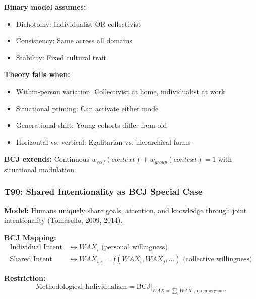 \begin{tcolorbox}[colback=red!5!white, colframe=red!75!black,
    title=Boundary Condition: Where Binary I/C Fails]
\textbf{Binary model assumes:}
\begin{itemize}[nosep]
\item Dichotomy: Individualist OR collectivist
\item Consistency: Same across all domains
\item Stability: Fixed cultural trait
\end{itemize}

\textbf{Theory fails when:}
\begin{itemize}[nosep]
\item Within-person variation: Collectivist at home, individualist at work
\item Situational priming: Can activate either mode
\item Generational shift: Young cohorts differ from old
\item Horizontal vs. vertical: Egalitarian vs. hierarchical forms
\end{itemize}

\textbf{BCJ extends:} Continuous $w_{self}(context) + w_{group}(context) = 1$ with situational modulation.
\end{tcolorbox}

\subsubsection*{T90: Shared Intentionality as BCJ Special Case}

\textbf{Model:} Humans uniquely share goals, attention, and knowledge through joint intentionality (Tomasello, 2009, 2014).

\textbf{BCJ Mapping:}
\begin{align}
\text{Individual Intent} &\leftrightarrow WAX_i \text{ (personal willingness)} \\
\text{Shared Intent} &\leftrightarrow WAX_{we} = f(WAX_i, WAX_j, ...) \text{ (collective willingness)}
\end{align}

\textbf{Restriction:}
\begin{equation}
\text{Methodological Individualism} = \text{BCJ} \big|_{WAX = \sum_i WAX_i, \, \text{no emergence}}
\end{equation}

